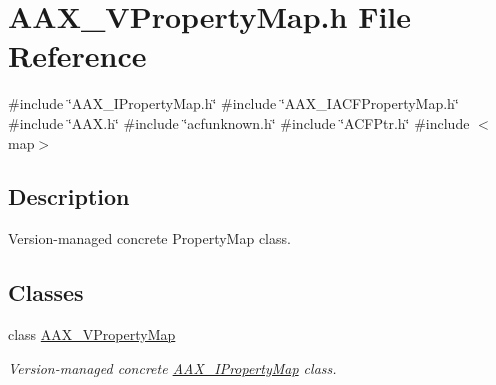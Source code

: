 \hypertarget{a00725}{}\section{A\+A\+X\+\_\+\+V\+Property\+Map.\+h File Reference}
\label{a00725}
{\ttfamily \#include \char`\"{}A\+A\+X\+\_\+\+I\+Property\+Map.\+h\char`\"{}}\newline
{\ttfamily \#include \char`\"{}A\+A\+X\+\_\+\+I\+A\+C\+F\+Property\+Map.\+h\char`\"{}}\newline
{\ttfamily \#include \char`\"{}A\+A\+X.\+h\char`\"{}}\newline
{\ttfamily \#include \char`\"{}acfunknown.\+h\char`\"{}}\newline
{\ttfamily \#include \char`\"{}A\+C\+F\+Ptr.\+h\char`\"{}}\newline
{\ttfamily \#include $<$map$>$}\newline


\subsection{Description}
Version-\/managed concrete Property\+Map class. 

\subsection*{Classes}
\begin{DoxyCompactItemize}
\item 
class \mbox{\hyperlink{a01937}{A\+A\+X\+\_\+\+V\+Property\+Map}}
\begin{DoxyCompactList}\small\item\em Version-\/managed concrete \mbox{\hyperlink{a01869}{A\+A\+X\+\_\+\+I\+Property\+Map}} class. \end{DoxyCompactList}\end{DoxyCompactItemize}

